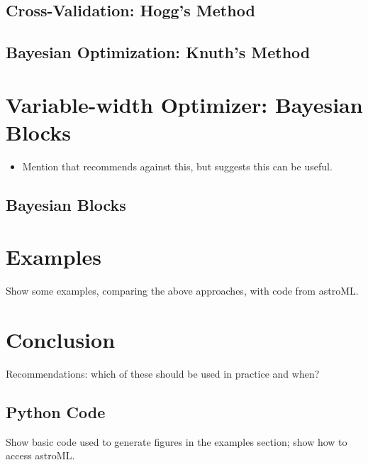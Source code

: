\documentclass[12pt]{article}
\begin{document}
\subsection{Cross-Validation: Hogg's Method}
\citep{Hogg2008}

\subsection{Bayesian Optimization: Knuth's Method}
\citep{Knuth2006}

\section{Variable-width Optimizer: Bayesian Blocks}
\label{sec:variable_width}
\begin{itemize}
  \item Mention that \citet{Birge2003} recommends against this, but
    \citet{Scott1992} suggests this can be useful.
\end{itemize}

\subsection{Bayesian Blocks}
\citep{Scargle1998, Scargle2012}

\section{Examples}
\label{sec:examples}
Show some examples, comparing the above approaches, with code from astroML.

\section{Conclusion}
\label{sec:conclusion}
Recommendations: which of these should be used in practice and when?



\begin{appendix}
\section{Python Code}
Show basic code used to generate figures in the examples section;
show how to access astroML.


\end{appendix}
\end{document}
